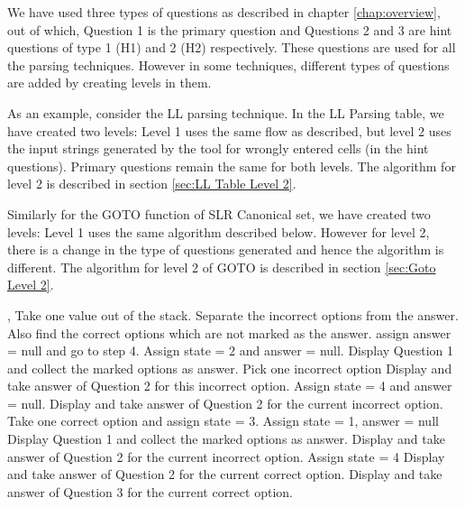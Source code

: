 \begin{algorithm}
\caption{}
\label{algo:}
\begin{algorithmic}[1]
\Function{}{}
\EndFunction
\end{algorithmic}
\end{algorithm}

We have used three types of questions as described in chapter \ref{chap:overview}, out of which, Question 1 is the primary question and Questions 2 and 3 are hint questions of type 1 (H1) and 2 (H2) respectively. These questions are used for all the parsing techniques. However in some techniques, different types of questions are added by creating levels in them.

As an example, consider the LL parsing technique. In the LL Parsing table, we have created two levels: Level 1 uses the same flow as described, but level 2 uses the input strings generated by the tool for wrongly entered cells (in the hint questions). Primary questions remain the same for both levels. The algorithm for level 2 is described in section \ref{sec:LL Table Level 2}.

Similarly for the GOTO function of SLR Canonical set, we have created two levels: Level 1 uses the same algorithm described below. However for level 2, there is a change in the type of questions generated and hence the algorithm is different. The algorithm for level 2 of GOTO is described in section \ref{sec:Goto Level 2}.

\begin{algorithm}                     
\begin{algorithmic} [1]
, 
\State Take one value out of the stack.
\State Separate the incorrect options from the answer.
\State Also find the correct options which are not marked as the answer.
\State assign answer = null and go to step 4.
\Else
\State Assign state = 2 and answer = null.
\EndIf
\Else
\State Display Question 1 and collect the marked options as answer.
\EndIf
\EndIf
{}
\State Pick one incorrect option
\State Display and take answer of Question 2 for this incorrect option.
\Else
\State Assign state = 4 and answer = null.
\EndIf
\Else
\State Display and take answer of Question 2 for the current incorrect option.
\EndIf
\EndIf
{}
\State Take one correct option and assign state = 3.
\Else
\State Assign state = 1, answer = null
\State Display Question 1 and collect the marked options as answer.
\EndIf
\Else
\State Display and take answer of Question 2 for the current incorrect option.
\EndIf
\EndIf
{}
\State Assign state = 4
\State Display and take answer of Question 2 for the current correct option.
\Else
\State Display and take answer of Question 3 for the current correct option.
\EndIf
\EndIf
\EndIf
\end{algorithmic}
\end{algorithm}

